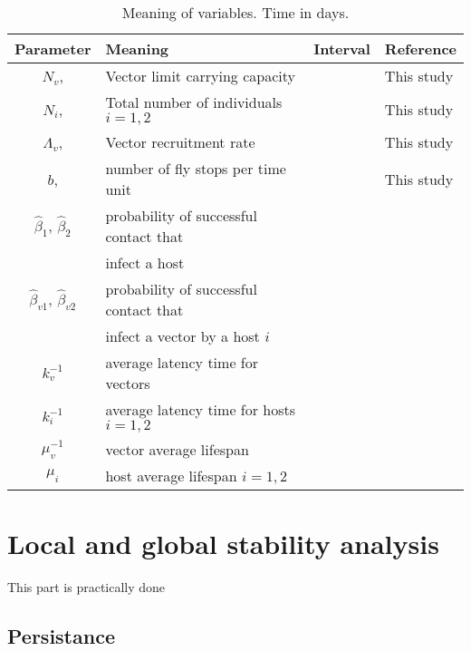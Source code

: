 \documentclass[preprint,12pt]{elsarticle}
\begin{document}
\begin{table*}[htb]
	\begin{center}
       
		\begin{tabular}{|c|l|l|l|}
			\hline
			Parameter		&	Meaning & Interval & Reference
			\\
			\hline
			$N_v$, & Vector limit carrying capacity&&This study
			\\
			$N_i$,& Total number of individuals $i=1,2$ &&This study
			\\
			$\Lambda_v$,& Vector recruitment rate & & This study
			\\
			$b$,&number of fly stops per time unit& &This study
			\\
			$\hat{\beta}_1$, $\hat{\beta}_2$& probability of successful contact that &&
				\\
			& infect a host &&
				\\
			$\hat{\beta}_{v1}$, $\hat{\beta}_{v2}$& probability of successful contact that &&
				\\
			& infect a vector by a host $i$ &&
				\\
			$k_v^{-1}$	& average latency time for vectors &&
			\\
			$k_{i}^{-1}$
			&
				average latency time for hosts $i=1,2$ &&
			\\
			 $\mu_v^{-1}$	& vector average lifespan &&
			\\
			$\mu_i$
			&
				host average lifespan $i=1,2$&& 
			\\
			
			\hline
		\end{tabular}
	\end{center}
	\caption{
		Meaning of variables. Time in days.	}
\end{table*}




\section{Local and global stability analysis}
\noindent This part is practically done
\subsection{Persistance}
\end{document}
